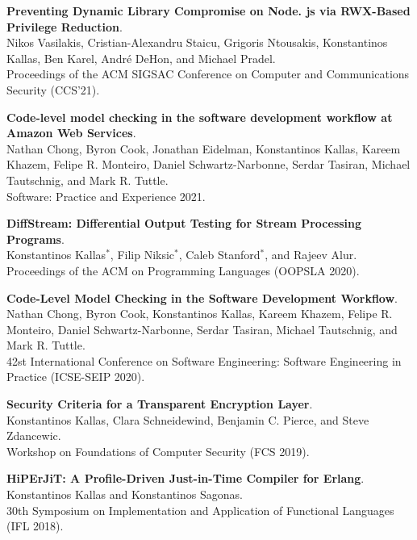 \begin{minipage}{\textwidth}
\textbf{Preventing Dynamic Library Compromise on Node. js via RWX-Based Privilege Reduction}. \\
Nikos Vasilakis, Cristian-Alexandru Staicu, Grigoris Ntousakis, Konstantinos Kallas, Ben Karel, André DeHon, and Michael Pradel. \\
Proceedings of the ACM SIGSAC Conference on Computer and Communications Security (CCS’21).
\end{minipage}

\begin{minipage}{\textwidth}
\textbf{Code-level model checking in the software development workflow at Amazon Web Services}. \\
Nathan Chong, Byron Cook, Jonathan Eidelman, Konstantinos Kallas, Kareem Khazem, Felipe R. Monteiro, Daniel Schwartz-Narbonne, Serdar Tasiran, Michael Tautschnig, and Mark R. Tuttle. \\
Software: Practice and Experience 2021.
\end{minipage}

\begin{minipage}{\textwidth}
\textbf{DiffStream: Differential Output Testing for Stream Processing Programs}. \\
Konstantinos Kallas$^*$, Filip Niksic$^*$, Caleb Stanford$^*$, and Rajeev Alur. \\
Proceedings of the ACM on Programming Languages (OOPSLA 2020).
\end{minipage}

\begin{minipage}{\textwidth}
\textbf{Code-Level Model Checking in the Software Development Workflow}. \\
Nathan Chong, Byron Cook, Konstantinos Kallas, Kareem Khazem, Felipe R. Monteiro, Daniel Schwartz-Narbonne, Serdar Tasiran, Michael Tautschnig, and Mark R. Tuttle. \\
42st International Conference on Software Engineering: Software Engineering in Practice (ICSE-SEIP 2020).
\end{minipage}

\begin{minipage}{\textwidth}
\textbf{Security Criteria for a Transparent Encryption Layer}. \\
Konstantinos Kallas, Clara Schneidewind, Benjamin C. Pierce, and Steve Zdancewic. \\
Workshop on Foundations of Computer Security (FCS 2019).
\end{minipage}

\begin{minipage}{\textwidth}
\textbf{HiPErJiT: A Profile-Driven Just-in-Time Compiler for Erlang}. \\
Konstantinos Kallas and Konstantinos Sagonas. \\
30th Symposium on Implementation and Application of Functional Languages (IFL 2018).
\end{minipage}


